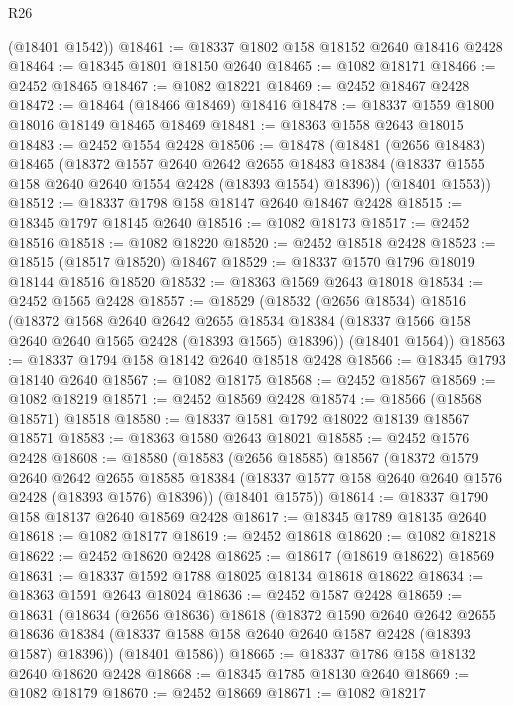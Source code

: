 \begin{lexlean}{R26}
\begin{coremodule}
      (@18401 @1542))
@18461 := @18337 @1802 @158 @18152 @2640 @18416 @2428
@18464 := @18345 @1801 @18150 @2640
@18465 := @1082 @18171
@18466 := @2452 @18465
@18467 := @1082 @18221
@18469 := @2452 @18467 @2428
@18472 := @18464 (@18466 @18469) @18416
@18478 := @18337 @1559 @1800 @18016 @18149 @18465 @18469
@18481 := @18363 @1558 @2643 @18015
@18483 := @2452 @1554 @2428
@18506 := @18478
    (@18481
      (@2656 @18483)
      @18465
      (@18372
        @1557
        @2640
        @2642
        @2655
        @18483
        @18384
        (@18337 @1555 @158 @2640 @2640 @1554 @2428 (@18393 @1554) @18396))
      (@18401 @1553))
@18512 := @18337 @1798 @158 @18147 @2640 @18467 @2428
@18515 := @18345 @1797 @18145 @2640
@18516 := @1082 @18173
@18517 := @2452 @18516
@18518 := @1082 @18220
@18520 := @2452 @18518 @2428
@18523 := @18515 (@18517 @18520) @18467
@18529 := @18337 @1570 @1796 @18019 @18144 @18516 @18520
@18532 := @18363 @1569 @2643 @18018
@18534 := @2452 @1565 @2428
@18557 := @18529
    (@18532
      (@2656 @18534)
      @18516
      (@18372
        @1568
        @2640
        @2642
        @2655
        @18534
        @18384
        (@18337 @1566 @158 @2640 @2640 @1565 @2428 (@18393 @1565) @18396))
      (@18401 @1564))
@18563 := @18337 @1794 @158 @18142 @2640 @18518 @2428
@18566 := @18345 @1793 @18140 @2640
@18567 := @1082 @18175
@18568 := @2452 @18567
@18569 := @1082 @18219
@18571 := @2452 @18569 @2428
@18574 := @18566 (@18568 @18571) @18518
@18580 := @18337 @1581 @1792 @18022 @18139 @18567 @18571
@18583 := @18363 @1580 @2643 @18021
@18585 := @2452 @1576 @2428
@18608 := @18580
    (@18583
      (@2656 @18585)
      @18567
      (@18372
        @1579
        @2640
        @2642
        @2655
        @18585
        @18384
        (@18337 @1577 @158 @2640 @2640 @1576 @2428 (@18393 @1576) @18396))
      (@18401 @1575))
@18614 := @18337 @1790 @158 @18137 @2640 @18569 @2428
@18617 := @18345 @1789 @18135 @2640
@18618 := @1082 @18177
@18619 := @2452 @18618
@18620 := @1082 @18218
@18622 := @2452 @18620 @2428
@18625 := @18617 (@18619 @18622) @18569
@18631 := @18337 @1592 @1788 @18025 @18134 @18618 @18622
@18634 := @18363 @1591 @2643 @18024
@18636 := @2452 @1587 @2428
@18659 := @18631
    (@18634
      (@2656 @18636)
      @18618
      (@18372
        @1590
        @2640
        @2642
        @2655
        @18636
        @18384
        (@18337 @1588 @158 @2640 @2640 @1587 @2428 (@18393 @1587) @18396))
      (@18401 @1586))
@18665 := @18337 @1786 @158 @18132 @2640 @18620 @2428
@18668 := @18345 @1785 @18130 @2640
@18669 := @1082 @18179
@18670 := @2452 @18669
@18671 := @1082 @18217

\end{coremodule}
\end{lexlean}
